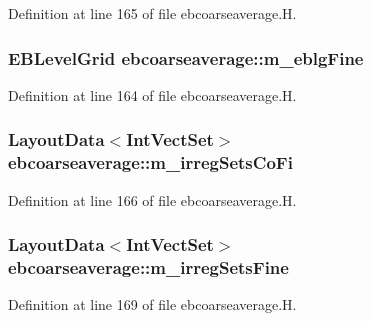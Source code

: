 Definition at line 165 of file ebcoarseaverage.\+H.

\subsubsection[{\texorpdfstring{m\+\_\+eblg\+Fine}{m_eblgFine}}]{\setlength{\rightskip}{0pt plus 5cm}E\+B\+Level\+Grid ebcoarseaverage\+::m\+\_\+eblg\+Fine\hspace{0.3cm}{\ttfamily [protected]}}\hypertarget{classebcoarseaverage_af7e65f929aae040988853c33135a3300}{}\label{classebcoarseaverage_af7e65f929aae040988853c33135a3300}


Definition at line 164 of file ebcoarseaverage.\+H.

\subsubsection[{\texorpdfstring{m\+\_\+irreg\+Sets\+Co\+Fi}{m_irregSetsCoFi}}]{\setlength{\rightskip}{0pt plus 5cm}Layout\+Data$<$Int\+Vect\+Set$>$ ebcoarseaverage\+::m\+\_\+irreg\+Sets\+Co\+Fi\hspace{0.3cm}{\ttfamily [protected]}}\hypertarget{classebcoarseaverage_a680dafd1a2f432720739a6c5ad9ddc2b}{}\label{classebcoarseaverage_a680dafd1a2f432720739a6c5ad9ddc2b}


Definition at line 166 of file ebcoarseaverage.\+H.

\subsubsection[{\texorpdfstring{m\+\_\+irreg\+Sets\+Fine}{m_irregSetsFine}}]{\setlength{\rightskip}{0pt plus 5cm}Layout\+Data$<$Int\+Vect\+Set$>$ ebcoarseaverage\+::m\+\_\+irreg\+Sets\+Fine\hspace{0.3cm}{\ttfamily [protected]}}\hypertarget{classebcoarseaverage_ae97f5983187a015c9cff6c8554ca1230}{}\label{classebcoarseaverage_ae97f5983187a015c9cff6c8554ca1230}


Definition at line 169 of file ebcoarseaverage.\+H.

